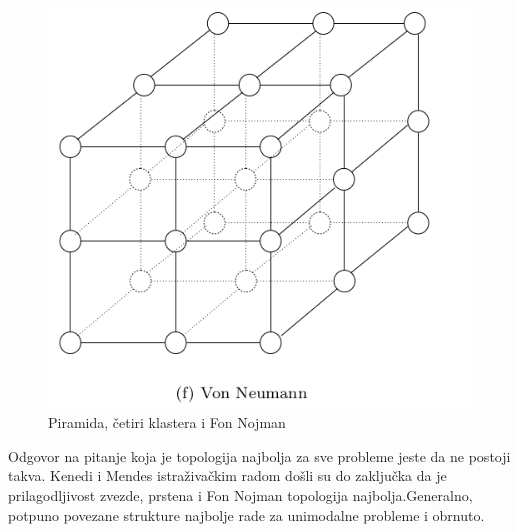 \documentclass[a4paper]{article}
\begin{document}
\begin{figure}[htp]
    \includegraphics[scale=0.2]{VonNeumann.png}
    \caption{Piramida, četiri klastera i Fon Nojman}
    \label{fig:PiramidaCetiriKlasteraFonNojman}
\end{figure}
Odgovor na pitanje koja je topologija najbolja za sve probleme jeste da ne postoji takva.
Kenedi i Mendes istraživačkim radom došli su do zaključka da je prilagodljivost zvezde, prstena i Fon Nojman topologija najbolja.Generalno, potpuno povezane strukture najbolje rade za unimodalne probleme i obrnuto.

\appendix
 

\end{document}
